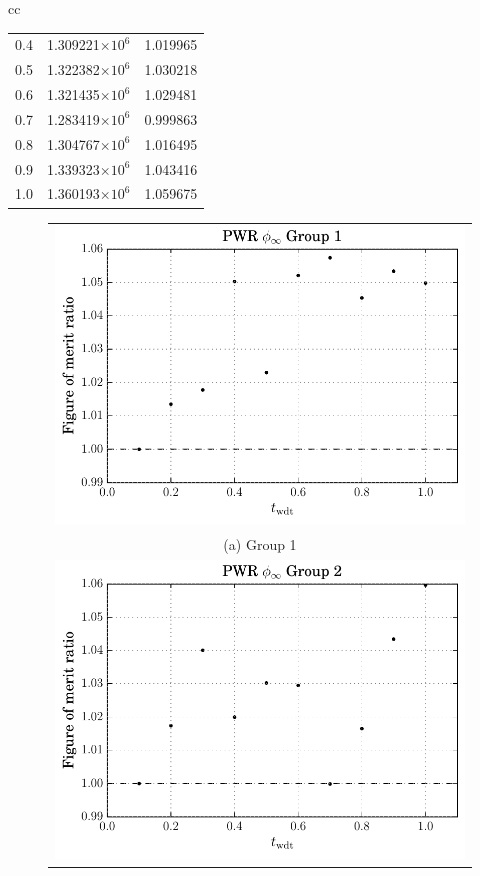 \begin{table}[hbtp]
\begin{tabular}{cc}
\begin{tabular}{lrr}
 0.4 & 1.309221$\times 10^{6}$ & 1.019965 \\
 0.5 & 1.322382$\times 10^{6}$ & 1.030218 \\
 0.6 & 1.321435$\times 10^{6}$ & 1.029481 \\
 0.7 & 1.283419$\times 10^{6}$ & 0.999863 \\
 0.8 & 1.304767$\times 10^{6}$ & 1.016495 \\
 0.9 & 1.339323$\times 10^{6}$ & 1.043416 \\
 1.0 & 1.360193$\times 10^{6}$ & 1.059675 \\
\bottomrule
\end{tabular}
  \end{tabular}

  \label{tab:pwr_inf_flx}
\end{table}
\begin{figure}[hbtp]
  \centering
  \begin{tabular}{c}
  \includegraphics[scale=0.9]{images/results/pwr_inf_flx_grp_1} \\
    (a) Group 1\\
  \includegraphics[scale=0.9]{images/results/pwr_inf_flx_grp_2} \\

\end{tabular}
\end{figure}
